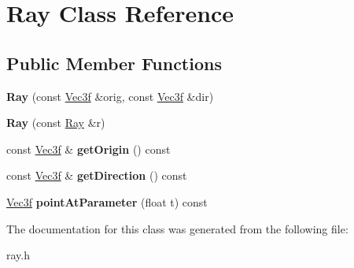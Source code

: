 \hypertarget{classRay}{\section{\-Ray \-Class \-Reference}
\label{classRay}
}
\subsection*{\-Public \-Member \-Functions}
\begin{DoxyCompactItemize}
\item 
\hypertarget{classRay_a3f5131016c3a436018e0f37872e887ed}{{\bfseries \-Ray} (const \hyperlink{classVec3f}{\-Vec3f} \&orig, const \hyperlink{classVec3f}{\-Vec3f} \&dir)}\label{classRay_a3f5131016c3a436018e0f37872e887ed}

\item 
\hypertarget{classRay_a42a3c560d1a0b25412c220025d4f0a94}{{\bfseries \-Ray} (const \hyperlink{classRay}{\-Ray} \&r)}\label{classRay_a42a3c560d1a0b25412c220025d4f0a94}

\item 
\hypertarget{classRay_ad00358184e1d27e1f92ddb10e6d8c5fb}{const \hyperlink{classVec3f}{\-Vec3f} \& {\bfseries get\-Origin} () const }\label{classRay_ad00358184e1d27e1f92ddb10e6d8c5fb}

\item 
\hypertarget{classRay_a68698a8b94ab05f42ead9f4a89d320f7}{const \hyperlink{classVec3f}{\-Vec3f} \& {\bfseries get\-Direction} () const }\label{classRay_a68698a8b94ab05f42ead9f4a89d320f7}

\item 
\hypertarget{classRay_a3ddbe6537c2fef2c3c638eda9329d66e}{\hyperlink{classVec3f}{\-Vec3f} {\bfseries point\-At\-Parameter} (float t) const }\label{classRay_a3ddbe6537c2fef2c3c638eda9329d66e}

\end{DoxyCompactItemize}


\-The documentation for this class was generated from the following file\-:\begin{DoxyCompactItemize}
\item 
ray.\-h\end{DoxyCompactItemize}
